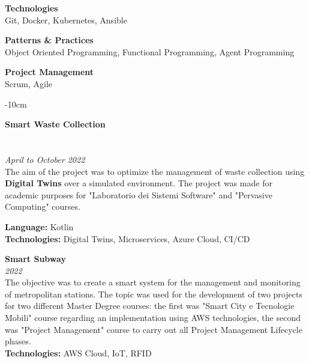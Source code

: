\documentclass[10pt,a4paper]{altacv}
\begin{document}
    \divider

    \textbf{Technologies} \\ \smallskip
    Git, Docker, Kubernetes, Ansible

    \divider

    \textbf{Patterns \& Practices} \\ \smallskip
    Object Oriented Programming, Functional Programming, Agent Programming

    \divider

    \textbf{Project Management} \\ \smallskip
    Scrum, Agile

    \divider

    \clearpage

\begin{adjustwidth}{}{-10cm}
    
    \textbf{Smart Waste Collection}\\
    \\
    \\
    \textit{April to October 2022}\\ \smallskip
    The aim of the project was to optimize the management of waste collection using \textbf{Digital Twins} over a simulated environment.
    The project was made for academic purposes for "Laboratorio dei Sistemi Software" and "Pervasive Computing" courses.\\
    \smallskip

    \textbf{Language:} Kotlin\\
    \textbf{Technologies:} Digital Twins, Microservices, Azure Cloud, CI/CD

    \divider

    \textbf{Smart Subway}\\
    \textit{2022}\\ \smallskip
    The objective was to create a smart system for the management and monitoring of metropolitan stations.
    The topic was used for the development of two projects for two different Master Degree courses: the first was "Smart City e Tecnologie Mobili" course regarding an implementation using AWS technologies,
    the second was "Project Management" course to carry out all Project Management Lifecycle phases.\\ \smallskip
    \textbf{Technologies:} AWS Cloud, IoT, RFID


\end{adjustwidth}
\end{document}
